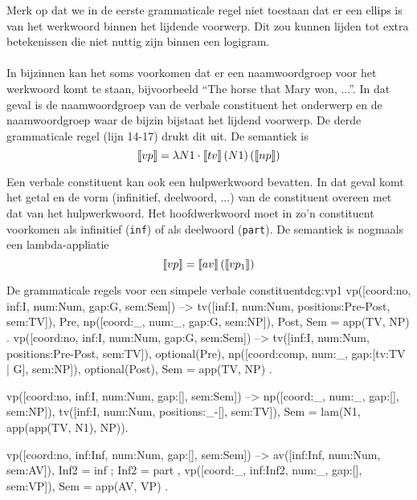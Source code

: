 Merk op dat we in de eerste grammaticale regel niet toestaan dat er een ellips is van het werkwoord binnen het lijdende voorwerp. Dit zou kunnen lijden tot extra betekenissen die niet nuttig zijn binnen een logigram.

\paragraph{} In bijzinnen kan het soms voorkomen dat er een naamwoordgroep voor het werkwoord komt te staan, bijvoorbeeld ``The horse that Mary won, ...''. In dat geval is de naamwoordgroep van de verbale constituent het onderwerp en de naamwoordgroep waar de bijzin bijstaat het lijdend voorwerp. De derde grammaticale regel (lijn 14-17) drukt dit uit. De semantiek is $$\llbracket vp\rrbracket = \lambda N1 \cdot \llbracket tv\rrbracket \left( N1 \right) \left( \llbracket np\rrbracket \right)$$

Een verbale constituent kan ook een hulpwerkwoord bevatten. In dat geval komt het getal en de vorm (infinitief, deelwoord, ...) van de constituent overeen met dat van het hulpwerkwoord. Het hoofdwerkwoord moet in zo'n constituent voorkomen als infinitief (\texttt{inf}) of als deelwoord (\texttt{part}). De semantiek is nogmaals een lambda-appliatie $$\llbracket vp\rrbracket = \llbracket av\rrbracket \left( \llbracket vp_1\rrbracket \right)$$

\begin{dcg}{De grammaticale regels voor een simpele verbale constituent}{dcg:vp1}
vp([coord:no, inf:I, num:Num, gap:G, sem:Sem]) -->
  tv([inf:I, num:Num, positions:Pre-Post, sem:TV]),
  Pre,
  np([coord:_, num:_, gap:G, sem:NP]),
  Post,
  { Sem = app(TV, NP) }.
vp([coord:no, inf:I, num:Num, gap:G, sem:Sem]) -->
  tv([inf:I, num:Num, positions:Pre-Post, sem:TV]),
  optional(Pre),
  np([coord:comp, num:_, gap:[tv:TV | G], sem:NP]),
  optional(Post),
  { Sem = app(TV, NP) }.

vp([coord:no, inf:I, num:Num, gap:[], sem:Sem]) -->
  np([coord:_, num:_, gap:[], sem:NP]),
  tv([inf:I, num:Num, positions:_-[], sem:TV]),
  { Sem = lam(N1, app(app(TV, N1), NP))}.

vp([coord:no, inf:Inf, num:Num, gap:[], sem:Sem]) -->
  av([inf:Inf, num:Num, sem:AV]),
  { Inf2 = inf ; Inf2 = part },
  vp([coord:_, inf:Inf2, num:_, gap:[], sem:VP]),
  { Sem = app(AV, VP) }.
\end{dcg}

